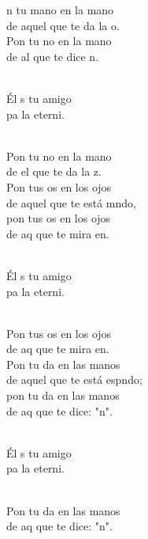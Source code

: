 \documentclass[12pt]{article}
\begin{document}
\begin{multicols*}{2}
\begin{cancion}%
	n tu mano en la mano \\
	de aquel que te da la o.\\
	Pon tu no en la mano \\
	de al que te dice n.\\\jump\\
	\begin{chorus}%
	Él s tu amigo \\
	pa la eterni.\\
	\end{chorus}%
	\jump\\
	Pon tu no en la mano \\
	de el que te da la z.\\
\jump
	Pon tus os en los ojos\\
	de aquel que te está mndo,\\
	pon tus os en los ojos \\
	de aq que te mira en.\\\jump\\
	\begin{chorus}%
	Él s tu amigo \\
	pa la eterni.\\
	\end{chorus}%
	\jump\\
	Pon tus os en los ojos \\
	de aq que te mira en.\\
\jump
	Pon tu da en las manos\\
	de aquel que te está espndo;\\
	pon tu da en las manos\\
	de aq que te dice: "n".\\\jump\\
	\begin{chorus}%
	Él s tu amigo \\
	pa la eterni.\\
	\end{chorus}%
	\jump\\
	Pon tu da en las manos\\
	de aq que te dice: "n".\\
\end{cancion}%


\end{multicols*}
\end{document}
